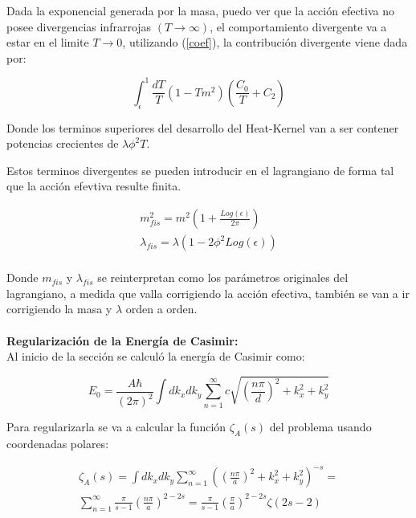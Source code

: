 Dada la exponencial generada por la masa, puedo ver que la acción efectiva no posee divergencias infrarrojas $(T \rightarrow \infty)$, el comportamiento divergente va a estar en el limite $T \rightarrow 0$, utilizando (\ref{coef}), la contribución divergente viene dada por:


\begin{equation}
\int _ { \epsilon } ^{1}  
\frac{ dT}{T} 
\left(
		1 - T m^2
		\right)
\left(
		\frac{C _0}{T} + C _2 
		\right)
\end{equation}


Donde los terminos superiores del desarrollo del Heat-Kernel van a ser contener potencias crecientes de $ \lambda \phi ^2 T $.


Estos terminos divergentes se pueden introducir en el lagrangiano de forma tal que la acción efevtiva resulte finita.

\begin{equation}
\begin{array}{c}
m ^2 _{fis} = m ^2 \left(
							1 + \frac{Log (\epsilon)}{2 \pi} 
							\right) \\[10pt]
							
\lambda _{fis} = \lambda \left(
								 1 - 2 \phi ^2 Log( \epsilon )
								 \right) \\[10pt]


\end{array}
\end{equation}

Donde $m _{fis}$ y $ \lambda _{fis} $ se reinterpretan como los parámetros originales del lagrangiano, a medida que valla corrigiendo la acción efectiva, también se van a ir corrigiendo la masa y $\lambda $ orden a orden. \\ \\

\textbf{Regularización de la Energía de Casimir:}\\

Al inicio de la sección se calculó la energía de Casimir como:

\begin{equation}
E _0 = \frac{A \hbar }{(2 \pi) ^2} \int dk _x dk _y 
\sum _{n=1} ^{\infty} 
c
\sqrt{
		\left( \frac{n \pi}{d} \right) ^2 + k _x ^2 + k _y ^2
		}
\end{equation}

Para regularizarla se va a calcular la función $\zeta _A (s)$ del problema usando coordenadas polares:

\begin{equation}
\begin{array}{c}

\zeta _A (s) = 
\int dk _x dk _y 
\sum _{n=1} ^{\infty} 
\left(	\left( \frac{n \pi}{a } \right) ^2 + k _x ^2 + k _y ^2
		\right) ^{-s} = \\[10pt]
\sum _{n=1} ^{\infty}  \frac{\pi}{s-1} \left( \frac{n \pi}{a} \right) ^{2-2s} =
\frac{\pi}{s-1} \left( \frac{\pi}{a} \right) ^{2-2s} \zeta (2s-2) 

\end{array}
\end{equation}

